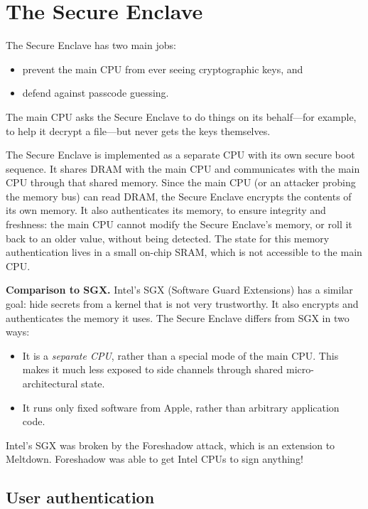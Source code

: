 \documentclass[
  letterpaper,
]{scrbook}
\providecommand{\tightlist}{%
  \setlength{\itemsep}{0pt}\setlength{\parskip}{0pt}}
\theoremstyle{definition}
\theoremstyle{plain}
\theoremstyle{plain}
\theoremstyle{remark}
\begin{document}
\section{The Secure Enclave}\label{sec-ios-enclave}

The Secure Enclave has two main jobs:

\begin{itemize}
\tightlist
\item
  prevent the main CPU from ever seeing cryptographic keys, and
\item
  defend against passcode guessing.
\end{itemize}

The main CPU asks the Secure Enclave to do things on its behalf---for
example, to help it decrypt a file---but never gets the keys themselves.

The Secure Enclave is implemented as a separate CPU with its own secure
boot sequence. It shares DRAM with the main CPU and communicates with
the main CPU through that shared memory. Since the main CPU (or an
attacker probing the memory bus) can read DRAM, the Secure Enclave
encrypts the contents of its own memory. It also authenticates its
memory, to ensure integrity and freshness: the main CPU cannot modify
the Secure Enclave's memory, or roll it back to an older value, without
being detected. The state for this memory authentication lives in a
small on-chip SRAM, which is not accessible to the main CPU.

\textbf{Comparison to SGX.} Intel's SGX (Software Guard Extensions) has
a similar goal: hide secrets from a kernel that is not very trustworthy.
It also encrypts and authenticates the memory it uses. The Secure
Enclave differs from SGX in two ways:

\begin{itemize}
\tightlist
\item
  It is a \emph{separate CPU}, rather than a special mode of the main
  CPU. This makes it much less exposed to side channels through shared
  micro-architectural state.
\item
  It runs only fixed software from Apple, rather than arbitrary
  application code.
\end{itemize}

Intel's SGX was broken by the Foreshadow attack, which is an extension
to Meltdown. Foreshadow was able to get Intel CPUs to sign anything!

\subsection{User authentication}\label{user-authentication}
\end{document}
